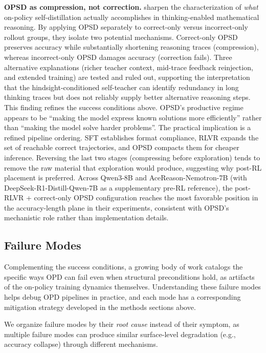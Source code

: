 \documentclass{article} %
\begin{document}
\textbf{OPSD as compression, not correction.} \citet{kim2026opsdcompresses} sharpen the characterization of \emph{what} on-policy self-distillation actually accomplishes in thinking-enabled mathematical reasoning. By applying OPSD separately to correct-only versus incorrect-only rollout groups, they isolate two potential mechanisms. Correct-only OPSD preserves accuracy while substantially shortening reasoning traces (compression), whereas incorrect-only OPSD damages accuracy (correction fails). Three alternative explanations (richer teacher context, mid-trace feedback reinjection, and extended training) are tested and ruled out, supporting the interpretation that the hindsight-conditioned self-teacher can identify redundancy in long thinking traces but does not reliably supply better alternative reasoning steps. This finding refines the success conditions above. OPSD's productive regime appears to be ``making the model express known solutions more efficiently'' rather than ``making the model solve harder problems''. The practical implication is a refined pipeline ordering. SFT establishes format compliance, RLVR expands the set of reachable correct trajectories, and OPSD compacts them for cheaper inference. Reversing the last two stages (compressing before exploration) tends to remove the raw material that exploration would produce, suggesting why post-RL placement is preferred. Across Qwen3-8B and AceReason-Nemotron-7B (with DeepSeek-R1-Distill-Qwen-7B as a supplementary pre-RL reference), the post-RLVR + correct-only OPSD configuration reaches the most favorable position in the accuracy-length plane in their experiments, consistent with OPSD's mechanistic role rather than implementation details.

\subsection{Failure Modes}
\label{subsec:failure}

Complementing the success conditions, a growing body of work catalogs the specific ways OPD can fail even when structural preconditions hold, as artifacts of the on-policy training dynamics themselves. Understanding these failure modes helps debug OPD pipelines in practice, and each mode has a corresponding mitigation strategy developed in the methods sections above.

We organize failure modes by their \emph{root cause} instead of their symptom, as multiple failure modes can produce similar surface-level degradation (e.g., accuracy collapse) through different mechanisms.
\end{document}
